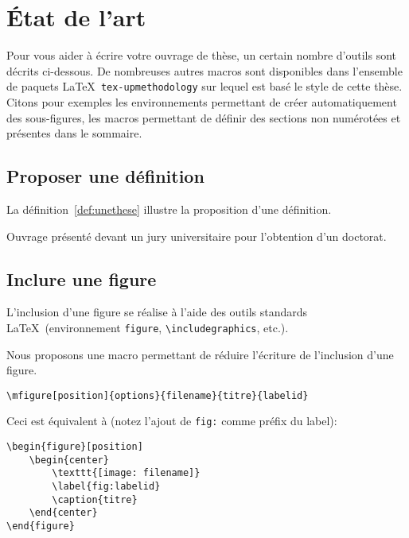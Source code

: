 \documentclass[french]{spimubphdthesis}
\begin{document}
\chapter{\'Etat de l'art}

%
\chapterintro

Pour vous aider à écrire votre ouvrage de thèse, un certain nombre d'outils sont décrits ci-dessous.
De nombreuses autres macros sont disponibles dans l'ensemble de paquets \LaTeX\ \texttt{tex-upmethodology}
sur lequel est basé le style de cette thèse. Citons pour exemples les environnements permettant de créer
automatiquement des sous-figures, les macros permettant de définir des sections non numérotées et présentes
dans le sommaire.

\section{Proposer une définition}

La définition~\ref{def:unethese} illustre la proposition d'une définition.

\begin{definition} \label{def:unethese}
Ouvrage présenté devant un jury universitaire pour l'obtention d'un doctorat.
\end{definition}

\section{Inclure une figure}

L'inclusion d'une figure se réalise à l'aide des outils standards \LaTeX\ (environnement \texttt{figure}, \texttt{{\textbackslash}includegraphics}, etc.).

Nous proposons une macro permettant de réduire l'écriture de l'inclusion d'une figure.

\begin{verbatim}
\mfigure[position]{options}{filename}{titre}{labelid}
\end{verbatim}

Ceci est équivalent à (notez l'ajout de \texttt{fig:} comme préfix du label):
\begin{verbatim}
\begin{figure}[position]
	\begin{center}
		\texttt{[image: filename]}
		\label{fig:labelid}
		\caption{titre}
	\end{center}
\end{figure}
\end{verbatim}
\end{document}
